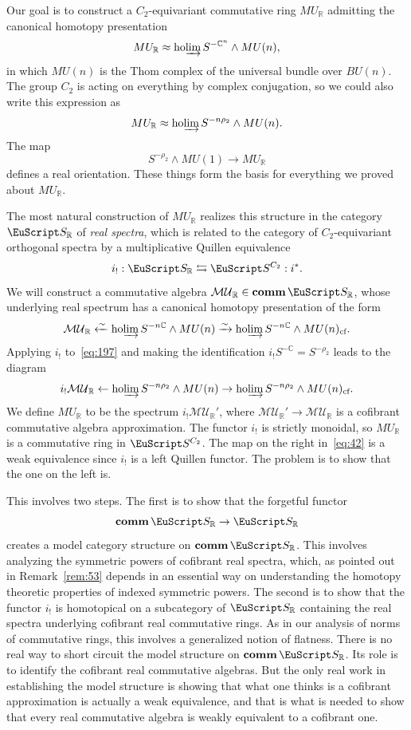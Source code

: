 \documentclass{amsart}
\theoremstyle{definition}
\theoremstyle{remark}
\newcommand{\R}{{\mathbb R}}
\newcommand{\C}{\mathbb C}
\newcommand{\spectra}{\EuScript S}
\newcommand{\mur}{MU_{\R}}
\newcommand{\MUR}{\mathcal{MU}_{\R}}
\DeclareMathOperator{\ho}{ho}
\newcommand{\ugspectra}[1]{\spectra^{#1}}
\newcommand{\hocolim}{\ho\!\varinjlim}
\newcommand{\zt}{C_{2}}
\DeclareMathOperator{\comm}{\mathbf{comm}}
\newcommand{\rspectra}{\spectra_{\R}}
\begin{document}
Our goal is to construct a $\zt$-equivariant commutative ring $\mur$
admitting the canonical homotopy presentation
\begin{equation}
\label{eq:141}
\mur \approx \hocolim S^{-\C^{n}}\wedge MU(n),
\end{equation}
in which $MU(n)$ is the Thom complex of the universal bundle over
$BU(n)$.  The group $\zt$ is acting on everything by complex
conjugation, so we could also write this expression as 
\begin{equation}
\label{eq:143}
\mur \approx \hocolim S^{-n\rho_{2}}\wedge MU(n).
\end{equation}
The map
\[
S^{-\rho_{2}}\wedge MU(1) \to \mur
\]
defines a real orientation.  These things form the basis for
everything we proved about $\mur$.

The most natural construction of $\mur$ realizes
this structure in the category $\rspectra$ of {\em real spectra},
which is related to the category of $\zt$-equivariant orthogonal
spectra by a multiplicative Quillen equivalence
\[
i_{!}:\rspectra \leftrightarrows \ugspectra{\zt}:i^{\ast}.
\]
We will construct a commutative algebra $\MUR\in\comm\rspectra$, whose
underlying real spectrum has a canonical homotopy presentation of the form
\begin{equation}
\label{eq:197}
\MUR \xleftarrow{\sim} \hocolim S^{-n\C}\wedge MU(n)\xrightarrow{\sim}
\hocolim S^{-n\C}\wedge MU(n)_{\text{cf}}.
\end{equation}
Applying $i_{!}$ to~\eqref{eq:197} and making the identification
$i_{!}S^{-\C}=S^{-\rho_{2}}$ leads to the diagram
\begin{equation}
\label{eq:42}
i_{!}\MUR \leftarrow \hocolim S^{-n\rho_{2}}\wedge MU(n)\rightarrow 
\hocolim S^{-n\rho_{2}}\wedge MU(n)_{\text{cf}}.
\end{equation}
We define $\mur$ to be the spectrum $i_{!}\MUR'$, where $\MUR'\to
\MUR$ is a cofibrant commutative algebra approximation.  The functor
$i_{!}$ is strictly monoidal, so $\mur$ is a commutative ring in
$\ugspectra{\zt}$.  The map on the right in~\eqref{eq:42} is a weak
equivalence since $i_{!}$ is a left Quillen functor.  The problem is
to show that the one on the left is.

This involves two steps.  The first is to show that the forgetful
functor
\[
\comm\rspectra\to\rspectra
\]
creates a model category structure on $\comm\rspectra$.  This involves
analyzing the symmetric powers of cofibrant real spectra, which, as
pointed out in Remark~\ref{rem:53} depends in an essential way on
understanding the homotopy theoretic properties of indexed symmetric
powers.  The second is to show that the functor $i_{!}$ is homotopical
on a subcategory of $\rspectra$ containing the real spectra underlying
cofibrant real commutative rings.  As in our analysis of norms of
commutative rings, this involves a generalized notion of flatness.
There is no real way to short circuit the model structure on
$\comm\rspectra$.  Its role is to identify the cofibrant real
commutative algebras.  But the only real work in establishing the
model structure is showing that what one thinks is a cofibrant
approximation is actually a weak equivalence, and that is what is
needed to show that every real commutative algebra is weakly
equivalent to a cofibrant one.  
\end{document}
